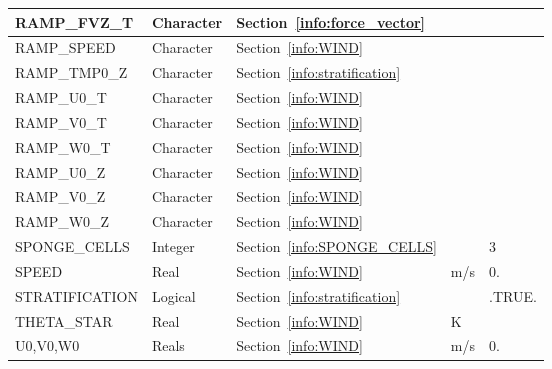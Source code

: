 \documentclass[11pt]{book}
\begin{document}
\begin{longtable}{@{\extracolsep{\fill}}|l|l|l|l|l|}
{\ct RAMP\_FVZ\_T}                              & Character     & Section~\ref{info:force_vector}               &               &                   \\ \hline
{\ct RAMP\_SPEED}                               & Character     & Section~\ref{info:WIND}                       &               &                   \\ \hline
{\ct RAMP\_TMP0\_Z}                             & Character     & Section~\ref{info:stratification}             &               &                   \\ \hline
{\ct RAMP\_U0\_T}                               & Character     & Section~\ref{info:WIND}                       &               &                   \\ \hline
{\ct RAMP\_V0\_T}                               & Character     & Section~\ref{info:WIND}                       &               &                   \\ \hline
{\ct RAMP\_W0\_T}                               & Character     & Section~\ref{info:WIND}                       &               &                   \\ \hline
{\ct RAMP\_U0\_Z}                               & Character     & Section~\ref{info:WIND}                       &               &                   \\ \hline
{\ct RAMP\_V0\_Z}                               & Character     & Section~\ref{info:WIND}                       &               &                   \\ \hline
{\ct RAMP\_W0\_Z}                               & Character     & Section~\ref{info:WIND}                       &               &                   \\ \hline
{\ct SPONGE\_CELLS}                             & Integer       & Section~\ref{info:SPONGE_CELLS}               &               & 3                 \\ \hline
{\ct SPEED}                                     & Real          & Section~\ref{info:WIND}                       & m/s           & 0.                \\ \hline
{\ct STRATIFICATION}                            & Logical       & Section~\ref{info:stratification}             &               & {\ct .TRUE.}      \\ \hline
{\ct THETA\_STAR}                               & Real          & Section~\ref{info:WIND}                       & K             &                   \\ \hline
{\ct U0,V0,W0}                                  & Reals         & Section~\ref{info:WIND}                       & m/s           & 0.                \\ \hline

\end{longtable}
\end{document}

